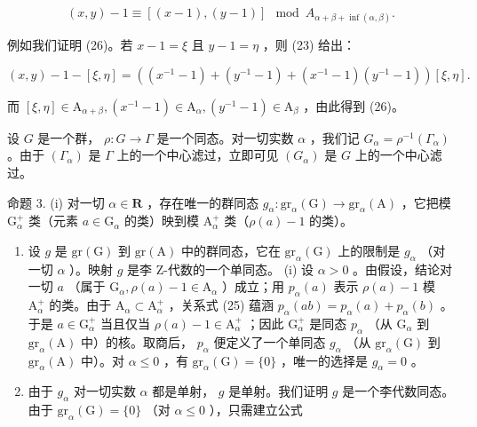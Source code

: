 \[
(x, y) - 1 \equiv [ (x - 1), (y - 1) ] \mod A _ {\alpha + \beta + \inf (\alpha , \beta)}.\tag{26}
\]

例如我们证明 (26)。若 \(x - 1 = \xi\) 且 \(y - 1 = \eta\) ，则 (23) 给出：

\[
(x, y) - 1 - [ \xi , \eta ] = ((x ^ {- 1} - 1) + (y ^ {- 1} - 1) + (x ^ {- 1} - 1) (y ^ {- 1} - 1)) [ \xi , \eta ].
\]

而 \([\xi, \eta] \in \mathrm{A}_{\alpha + \beta}, (x^{-1} - 1) \in \mathrm{A}_{\alpha}, (y^{-1} - 1) \in \mathrm{A}_{\beta}\) ，由此得到 (26)。

设 \(G\) 是一个群， \(\rho: G \to \Gamma\) 是一个同态。对一切实数 \(\alpha\) ，我们记 \(G_{\alpha} = \rho^{-1}(\Gamma_{\alpha})\) 。由于 \((\Gamma_{\alpha})\) 是 \(\Gamma\) 上的一个中心滤过，立即可见 \((G_{\alpha})\) 是 \(G\) 上的一个中心滤过。

命题 3. (i) 对一切 \(\alpha \in \mathbf{R}\) ，存在唯一的群同态 \(g_{\alpha} \colon \mathrm{gr}_{\alpha}(\mathrm{G}) \to \mathrm{gr}_{\alpha}(\mathrm{A})\) ，它把模 \(\mathrm{G}_{\alpha}^{+}\) 类（元素 \(a \in \mathrm{G}_{\alpha}\) 的类）映到模 \(\mathrm{A}_{\alpha}^{+}\) 类（\(\rho(a) - 1\) 的类）。

\begin{enumerate}
\def\labelenumi{(\roman{enumi})}
\setcounter{enumi}{1}
\item
  设 \(g\) 是 \(\mathrm{gr}(\mathrm{G})\) 到 \(\mathrm{gr}(\mathrm{A})\) 中的群同态，它在 \(\mathrm{gr}_{\alpha}(\mathrm{G})\) 上的限制是 \(g_{\alpha}\) （对一切 \(\alpha\) ）。映射 \(g\) 是李 Z-代数的一个单同态。 (i) 设 \(\alpha > 0\) 。由假设，结论对一切 \(a\) （属于 \(\mathrm{G}_{\alpha}, \rho(a) - 1 \in \mathrm{A}_{\alpha}\) ）成立；用 \(p_{\alpha}(a)\) 表示 \(\rho(a) - 1\) 模 \(\mathrm{A}_{\alpha}^{+}\) 的类。由于 \(\mathrm{A}_{\alpha} \subset \mathrm{A}_{\alpha}^{+}\) ，关系式 (25) 蕴涵 \(p_{\alpha}(ab) = p_{\alpha}(a) + p_{\alpha}(b)\) 。于是 \(a \in \mathrm{G}_{\alpha}^{+}\) 当且仅当 \(\rho(a) - 1 \in \mathrm{A}_{\alpha}^{+}\) ；因此 \(\mathrm{G}_{\alpha}^{+}\) 是同态 \(p_{\alpha}\) （从 \(\mathrm{G}_{\alpha}\) 到 \(\mathrm{gr}_{\alpha}(\mathrm{A})\) 中）的核。取商后， \(p_{\alpha}\) 便定义了一个单同态 \(g_{\alpha}\) （从 \(\mathrm{gr}_{\alpha}(\mathrm{G})\) 到 \(\mathrm{gr}_{\alpha}(\mathrm{A})\) 中）。对 \(\alpha \leqslant 0\) ，有 \(\mathrm{gr}_{\alpha}(\mathrm{G}) = \{0\}\) ，唯一的选择是 \(g_{\alpha} = 0\) 。
\item
  由于 \(g_{\alpha}\) 对一切实数 \(\alpha\) 都是单射， \(g\) 是单射。我们证明 \(g\) 是一个李代数同态。由于 \(\mathrm{gr}_{\alpha}(\mathrm{G}) = \{0\}\) （对 \(\alpha \leqslant 0\) ），只需建立公式
\end{enumerate}

